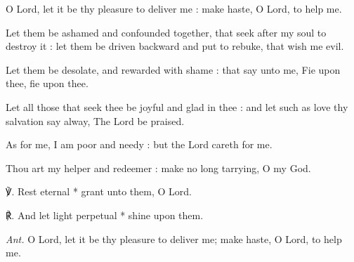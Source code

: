 O Lord, let it be thy pleasure to deliver me : make haste, O Lord, to help me.\par
{}Let them be ashamed and confounded together, that seek after my soul to destroy it : let them be driven backward and put to rebuke, that wish me evil.\par
{}Let them be desolate, and rewarded with shame : that say unto me, Fie upon thee, fie upon thee.\par
{}Let all those that seek thee be joyful and glad in thee : and let such as love thy salvation say alway, The Lord be praised.\par
{}As for me, I am poor and needy : but the Lord careth for me.\par
{}Thou art my helper and redeemer : make no long tarrying, O my God.\par
℣. Rest eternal * grant unto them, O Lord.\par
℟. And let light perpetual * shine upon them.\par\noindent
\textit{Ant.} O Lord, let it be thy pleasure to deliver me; make haste, O Lord, to help me.

